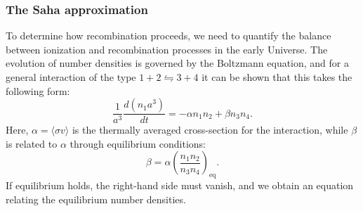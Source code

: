 \documentclass{aa}
\numberwithin{equation}{section}
\numberwithin{table}{section}
\numberwithin{figure}{section}
\begin{document}







\subsubsection{The Saha approximation}\label{subsubsec: II theory Saha}
To determine how recombination proceeds, we need to quantify the balance between ionization and recombination processes in the early Universe. The evolution of number densities is governed by the Boltzmann equation, and for a general interaction of the type $1 + 2 \leftrightharpoons 3 + 4$ it can be shown that this takes the following form: 
\begin{equation}
\frac{1}{a^3} \frac{d(n_1 a^3)}{dt} = -\alpha n_1 n_2 + \beta n_3 n_4. \label{eq: 1234}
\end{equation}
Here, $\alpha = \langle \sigma v \rangle$ is the thermally averaged cross-section for the interaction, while $\beta$ is related to $\alpha$ through equilibrium conditions:
\begin{equation}
\beta = \alpha \left( \frac{n_1 n_2}{n_3 n_4} \right)_{\text{eq}}. \label{eq: number densities}
\end{equation}
If equilibrium holds, the right-hand side must vanish, and we obtain an equation relating the equilibrium number densities.

\end{document}
